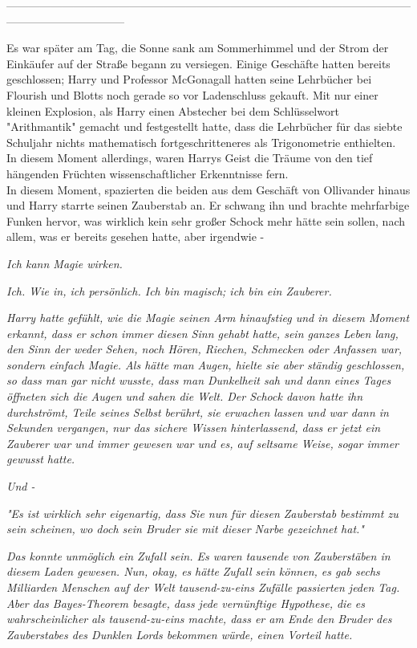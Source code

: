 {--------------------------------------------------------------------------------------------------------------------------------------------

Es war später am Tag, die Sonne sank am Sommerhimmel und der Strom der Einkäufer auf der Straße begann zu versiegen. Einige Geschäfte hatten bereits geschlossen; Harry und Professor McGonagall hatten seine Lehrbücher bei Flourish und Blotts noch gerade so vor Ladenschluss gekauft. Mit nur einer kleinen Explosion, als Harry einen Abstecher bei dem Schlüsselwort "Arithmantik" gemacht und festgestellt hatte, dass die Lehrbücher für das siebte Schuljahr nichts mathematisch fortgeschritteneres als Trigonometrie enthielten.\\ In diesem Moment allerdings, waren Harrys Geist die Träume von den tief hängenden Früchten wissenschaftlicher Erkenntnisse fern.\\ In diesem Moment, spazierten die beiden aus dem Geschäft von Ollivander hinaus und Harry starrte seinen Zauberstab an. Er schwang ihn und brachte mehrfarbige Funken hervor, was wirklich kein sehr großer Schock mehr hätte sein sollen, nach allem, was er bereits gesehen hatte, aber irgendwie -

\emph{Ich kann Magie wirken.}

\emph{Ich. Wie in, ich persönlich. Ich bin magisch; ich bin ein Zauberer.}

\emph{Harry hatte} \emph{\emph{gefühlt,}} \emph{wie die Magie seinen Arm hinaufstieg und in diesem Moment erkannt, dass er schon immer diesen Sinn gehabt hatte, sein ganzes Leben lang, den Sinn der weder Sehen, noch Hören, Riechen, Schmecken oder Anfassen war, sondern einfach Magie. Als hätte man} \emph{Augen, hielte sie aber ständig geschlossen, so dass man gar nicht wusste, dass man Dunkelheit sah und dann eines Tages öffneten sich die Augen und sahen die Welt. Der Schock davon hatte ihn durchströmt, Teile seines Selbst berührt, sie erwachen lassen und war dann in Sekunden vergangen, nur das sichere Wissen hinterlassend, dass er jetzt ein Zauberer war und immer gewesen war und es, auf seltsame Weise, sogar immer gewusst hatte.}

\emph{Und -}

\emph{\emph{"Es ist wirklich sehr eigenartig, dass Sie nun für diesen Zauberstab bestimmt zu sein scheinen, wo doch sein Bruder sie mit dieser Narbe gezeichnet hat."}}

\emph{Das konnte} \emph{\emph{unmöglich}} \emph{ein Zufall sein. Es waren} \emph{\emph{tausende}} \emph{von Zauberstäben in diesem Laden gewesen. Nun, okay, es} \emph{\emph{hätte}} \emph{Zufall sein können, es gab sechs Milliarden Menschen auf der Welt tausend-zu-eins Zufälle passierten jeden Tag. Aber das Bayes-Theorem besagte, dass jede vernünftige Hypothese, die es} \emph{\emph{wahrscheinlicher}} \emph{als tausend-zu-eins machte, dass er am Ende den Bruder des Zauberstabes des Dunklen Lords bekommen würde, einen Vorteil hatte.}

}
